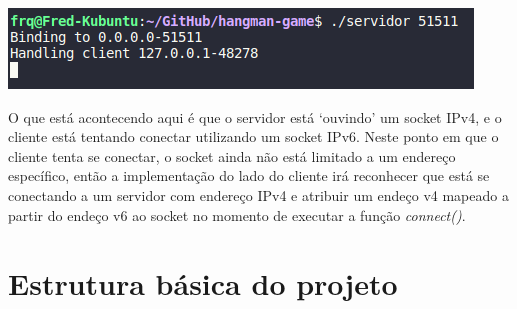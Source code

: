 \documentclass[12pt]{article}
\begin{document}
\begin{center}
    \includegraphics{Figura5.png}
\end{center}

O que está acontecendo aqui é que o servidor está `ouvindo' um socket IPv4, e o cliente está tentando conectar utilizando um socket IPv6.
Neste ponto em que o cliente tenta se conectar, o socket ainda não está limitado a um endereço específico, então a implementação do lado do cliente irá reconhecer que está se conectando a um servidor com endereço IPv4
e atribuir um endeço v4 mapeado a partir do endeço v6 ao socket no momento de executar a função \emph{connect()}.

\newpage
\section{Estrutura básica do projeto}
\end{document}
